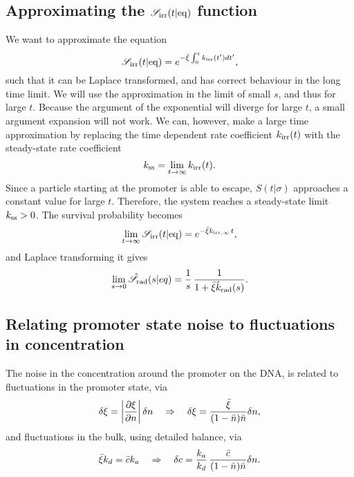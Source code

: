 \subsection{ Approximating the $\mathscr{S}_{\rm irr}(t|{\rm eq})$ function}
We want to approximate the equation
\begin{equation}
 \mathscr{S}_{\rm irr}(t|{\rm eq}) = e^{-\bar{\xi}\int_0^t k_{{\rm irr}}(t') dt'},
\end{equation}
such that it can be Laplace transformed, and has correct behaviour in the long time limit. We will use the approximation in the limit of small $s$, and thus for large $t$. Because the argument of the exponential will diverge for large $t$, a small argument expansion will not work. We can, however, make a large time approximation by replacing the time dependent rate coefficient $k_{{\rm irr}}(t)$ with the steady-state rate coefficient
\begin{equation}
 k_{\rm ss} = \lim_{t \to \infty} k_{{\rm irr}}(t).
\end{equation}
Since a particle starting at the promoter is able to escape, $S(t|\sigma)$ approaches a constant value for large $t$. Therefore, the system reaches a steady-state limit $k_{{\rm ss}} > 0$. The survival probability becomes  
\begin{equation}
 \lim_{t \to \infty} \mathscr{S}_{\rm irr}(t|{\rm eq}) = e^{-\bar{\xi} k_{{\rm irr},\infty}\,t},
\end{equation}
and Laplace transforming it gives
\begin{equation}
 \lim_{s \to 0} \hat{\mathscr{S}}_{\rm rad}(s|eq) = \frac{1}{s} \, \frac{1}{1 + \bar{\xi} \hat{k}_{\rm rad}(s)}.
\end{equation}


\subsection{Relating promoter state noise to fluctuations in concentration}
The noise in the concentration around the promoter on the DNA, is related to fluctuations in the promoter state, via 
\begin{equation}
 \delta \xi = \left|\frac{\partial \xi}{\partial n}\right| \delta n \quad \Rightarrow \quad  \delta \xi = \frac{\bar{\xi}}{(1-\bar{n})\bar{n}}\delta n,
 \elabel{EqxiNoise}
\end{equation}
and fluctuations in the bulk, using detailed balance, via
\begin{equation}
 \bar{\xi} k_d = \bar{c} k_a \quad \Rightarrow \quad \delta c = \frac{k_a}{k_d} \, \frac{\bar{c}}{(1-\bar{n})\bar{n}}\delta n.
 \elabel{EqcNoise}
\end{equation}


